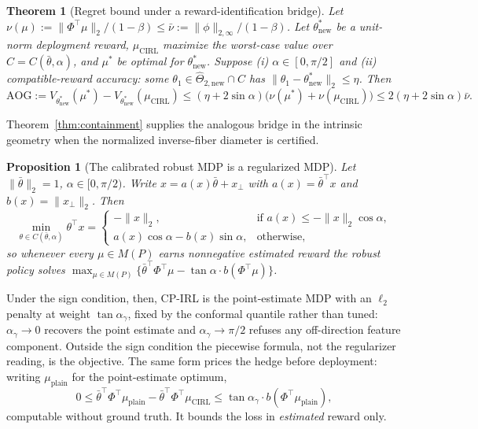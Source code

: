 \documentclass{article}
\newtheorem{theorem}{Theorem}
\newtheorem{proposition}{Proposition}
\newcommand{\method}{CP-IRL}
\begin{document}
\begin{theorem}[Regret bound under a reward-identification bridge]
\label{thm:regret}
Let $\nu(\mu):=\|\Phi^\top\mu\|_2/(1-\beta)\le\bar\nu:=\|\phi\|_{2,\infty}/(1-\beta)$.
Let $\theta^*_{\mathrm{new}}$ be a unit-norm deployment reward, $\mu_{\mathrm{CIRL}}$
maximize the worst-case value over $C=C(\bar\theta,\alpha)$, and $\mu^*$ be
optimal for $\theta^*_{\mathrm{new}}$. Suppose (i) $\alpha\in[0,\pi/2]$ and
(ii) \emph{compatible-reward accuracy}: some
$\theta_1\in\hat\Theta_{2,\mathrm{new}}\cap C$ has
$\|\theta_1-\theta^*_{\mathrm{new}}\|_2\le\eta$. Then
\[
\mathrm{AOG}:=V_{\theta^*_{\mathrm{new}}}(\mu^*)-V_{\theta^*_{\mathrm{new}}}(\mu_{\mathrm{CIRL}})
\le(\eta+2\sin\alpha)\big(\nu(\mu^*)+\nu(\mu_{\mathrm{CIRL}})\big)\le2(\eta+2\sin\alpha)\bar\nu .
\]
\end{theorem}

Theorem~\ref{thm:containment} supplies the analogous bridge in the intrinsic
geometry when the normalized inverse-fiber diameter is certified.

\begin{proposition}[The calibrated robust MDP is a regularized MDP]
\label{prop:regularizer}
Let $\|\bar\theta\|_2=1$, $\alpha\in[0,\pi/2)$. Write $x=a(x)\bar\theta+x_\perp$
with $a(x)=\bar\theta^\top x$ and $b(x)=\|x_\perp\|_2$. Then
\[
\min_{\theta\in C(\bar\theta,\alpha)}\theta^\top x=
\begin{cases}
-\|x\|_2, & \text{if } a(x)\le-\|x\|_2\cos\alpha,\\
a(x)\cos\alpha-b(x)\sin\alpha, & \text{otherwise,}
\end{cases}
\]
so whenever every $\mu\in M(P)$ earns nonnegative estimated reward the robust
policy solves $\max_{\mu\in M(P)}\{\bar\theta^\top\Phi^\top\mu-\tan\alpha\cdot
b(\Phi^\top\mu)\}$.
\end{proposition}

Under the sign condition, then, \method{} is the point-estimate MDP with an
$\ell_2$ penalty at weight $\tan\alpha_\gamma$, fixed by the conformal quantile
rather than tuned: $\alpha_\gamma\to0$ recovers the point estimate and
$\alpha_\gamma\to\pi/2$ refuses any off-direction feature component. Outside the
sign condition the piecewise formula, not the regularizer reading, is the
objective. The same form prices the hedge before deployment: writing
$\mu_{\mathrm{plain}}$ for the point-estimate optimum,
\[
0\le\bar\theta^\top\Phi^\top\mu_{\mathrm{plain}}-\bar\theta^\top\Phi^\top\mu_{\mathrm{CIRL}}
\le\tan\alpha_\gamma\cdot b(\Phi^\top\mu_{\mathrm{plain}}),
\]
computable without ground truth. It bounds the loss in \emph{estimated} reward
only.
\end{document}
